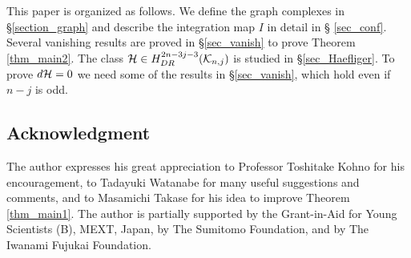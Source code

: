 This paper is organized as follows.
We define the graph complexes in \S \ref{section_graph} and describe the integration map $I$ in detail in \S
\ref{sec_conf}.
Several vanishing results are proved in \S \ref{sec_vanish} to prove Theorem \ref{thm_main2}.
The class $\mathcal{H} \in H^{2n-3j-3}_{DR}(\mathcal{K}_{n ,j})$ is studied in \S \ref{sec_Haefliger}.
To prove $d\mathcal{H} =0$ we need some of the results in \S \ref{sec_vanish}, which hold even if $n-j$ is odd.


\subsection*{Acknowledgment}
The author expresses his great appreciation to Professor Toshitake Kohno for his encouragement, to Tadayuki Watanabe
for many useful suggestions and comments, and to Masamichi Takase for his idea to improve Theorem \ref{thm_main1}.
The author is partially supported by the Grant-in-Aid for Young Scientists (B), MEXT, Japan, by The Sumitomo Foundation,
and by The Iwanami Fujukai Foundation.